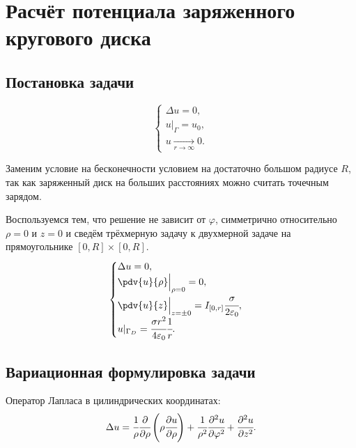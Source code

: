\newpage
\chapter{Расчёт потенциала заряженного кругового диска}
\section{Постановка задачи}
\begin{equation}
	\begin{cases}
		\Delta u = 0,\\
		u|_{\Gamma}=u_0,\\
		u\xrightarrow[r\rightarrow\infty]{}0.
	\end{cases}
\end{equation}

Заменим условие на бесконечности условием на достаточно большом радиусе $R$, так как заряженный диск на больших расстояниях можно считать точечным зарядом.

Воспользуемся тем, что решение не зависит от $\varphi$, симметрично относительно $\rho=0$ и $z=0$ и сведём трёхмерную задачу к двухмерной задаче на прямоугольнике $[0, R]\times[0,R]$.
\begin{equation}\label{disk_problem}
	\begin{cases}
		\Delta u = 0,\\
		\pdv{u}{\rho}\Bigr|_{\rho=0}=0,\\
		\pdv{u}{z}\Bigr|_{z=\pm 0}=I_{[0,r]}\cfrac{\sigma}{2\varepsilon_0},\\
		u|_{\Gamma_D}=\cfrac{\sigma r^2}{4 \varepsilon_0}\cfrac{1}{r}.
	\end{cases}
\end{equation}

\section{Вариационная формулировка задачи}
Оператор Лапласа в цилиндрических координатах:
\begin{equation}
	\Delta u = \cfrac{1}{\rho}\cfrac{\partial}{\partial \rho}\left(\rho\cfrac{\partial u}{\partial \rho}\right) + \cfrac{1}{\rho^2}\cfrac{\partial^2u}{\partial \varphi^2}+\cfrac{\partial^2u}{\partial z^2}.
\end{equation}

